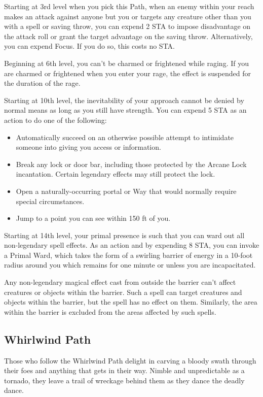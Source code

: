 
Starting at 3rd level when you pick this Path, when an enemy within your reach makes an attack against anyone but you or targets any creature other than you with a spell or saving throw, you can expend 2 STA to impose disadvantage on the attack roll or grant the target advantage on the saving throw. Alternatively, you can expend Focus. If you do so, this costs no STA.


Beginning at 6th level, you can’t be charmed or frightened while raging. If you are charmed or frightened when you enter your rage, the effect is suspended for the duration of the rage.


Starting at 10th level, the inevitability of your approach cannot be denied by normal means as long as you still have strength. You can expend 5 STA as an action to do one of the following:
\begin{itemize}
\item  Automatically succeed on an otherwise possible attempt to intimidate someone into giving you access or information.
\item  Break any lock or door bar, including those protected by the Arcane Lock incantation. Certain legendary effects may still protect the lock.
\item  Open a naturally-occurring portal or Way that would normally require special circumstances.
\item  Jump to a point you can see within 150 ft of you.
\end{itemize}


Starting at 14th level, your primal presence is such that you can ward out all non-legendary spell effects. As an action and by expending 8 STA, you can invoke a Primal Ward, which takes the form of a swirling barrier of energy in a 10-foot radius around you which remains for one minute or unless you are incapacitated.

Any non-legendary magical effect cast from outside the barrier can't affect creatures or objects within the barrier. Such a spell can target creatures and objects within the barrier, but the spell has no effect on them. Similarly, the area within the barrier is excluded from the areas affected by such spells.

\subsection{Whirlwind Path}
Those who follow the Whirlwind Path delight in carving a bloody swath through their foes and anything that gets in their way. Nimble and unpredictable as a tornado, they leave a trail of wreckage behind them as they dance the deadly dance.

